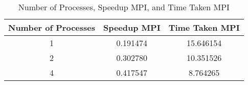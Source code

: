 \begin{table}[ht]
    \centering
    \setlength{\tabcolsep}{10pt} %
    \begin{tabular}{|c|c|c|}
        \hline
        \textbf{Number of Processes} & \textbf{Speedup MPI} & \textbf{Time
            Taken MPI}
        \\
        \hline
        1                            & 0.191474             & 15.646154
        \\
        2                            & 0.302780             & 10.351526
        \\
        4                            & 0.417547             & 8.764265
        \\
        \hline
    \end{tabular}
    \caption{Number of Processes, Speedup MPI, and Time Taken MPI}
    \label{table:2}
\end{table}
